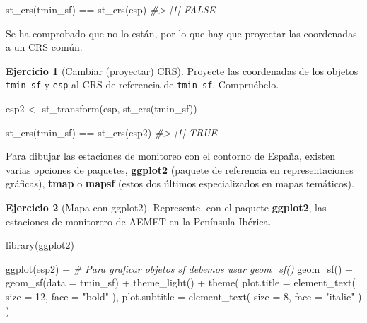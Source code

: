 \documentclass[
]{book}
\newenvironment{Shaded}{\begin{snugshade}}{\end{snugshade}}
\newcommand{\AttributeTok}[1]{\textcolor[rgb]{0.77,0.63,0.00}{#1}}
\newcommand{\CommentTok}[1]{\textcolor[rgb]{0.56,0.35,0.01}{\textit{#1}}}
\newcommand{\DecValTok}[1]{\textcolor[rgb]{0.00,0.00,0.81}{#1}}
\newcommand{\FunctionTok}[1]{\textcolor[rgb]{0.00,0.00,0.00}{#1}}
\newcommand{\NormalTok}[1]{#1}
\newcommand{\OtherTok}[1]{\textcolor[rgb]{0.56,0.35,0.01}{#1}}
\newcommand{\SpecialCharTok}[1]{\textcolor[rgb]{0.00,0.00,0.00}{#1}}
\newcommand{\StringTok}[1]{\textcolor[rgb]{0.31,0.60,0.02}{#1}}
\theoremstyle{definition}
\theoremstyle{definition}
\theoremstyle{definition}
\newtheorem{exercise}{Ejercicio}[chapter]
\theoremstyle{definition}
\theoremstyle{remark}
\begin{document}
\begin{Shaded}
\begin{Highlighting}[]
\FunctionTok{st\_crs}\NormalTok{(tmin\_sf) }\SpecialCharTok{==} \FunctionTok{st\_crs}\NormalTok{(esp)}
\CommentTok{\#\textgreater{} [1] FALSE}
\end{Highlighting}
\end{Shaded}

Se ha comprobado que no lo están, por lo que hay que proyectar las coordenadas a
un CRS común.

\begin{exercise}[Cambiar (proyectar) CRS]
\protect\hypertarget{exr:ex8}{}\label{exr:ex8}Proyecte las coordenadas de los objetos \texttt{tmin\_sf} y \texttt{esp} al CRS de referencia
de \texttt{tmin\_sf}. Compruébelo.
\end{exercise}

\begin{Shaded}
\begin{Highlighting}[]
\NormalTok{esp2 }\OtherTok{\textless{}{-}} \FunctionTok{st\_transform}\NormalTok{(esp, }\FunctionTok{st\_crs}\NormalTok{(tmin\_sf))}

\FunctionTok{st\_crs}\NormalTok{(tmin\_sf) }\SpecialCharTok{==} \FunctionTok{st\_crs}\NormalTok{(esp2)}
\CommentTok{\#\textgreater{} [1] TRUE}
\end{Highlighting}
\end{Shaded}

Para dibujar las estaciones de monitoreo con el contorno de España, existen
varias opciones de paquetes, \textbf{ggplot2} \citep{R-ggplot} (paquete de referencia en
representaciones gráficas), \textbf{tmap} \citep{R-tmap} o \textbf{mapsf} \citep{R-mapsf} (estos dos
últimos especializados en mapas temáticos).

\begin{exercise}[Mapa con ggplot2]
\protect\hypertarget{exr:ex9}{}\label{exr:ex9}Represente, con el paquete \textbf{ggplot2}, las estaciones de monitorero de AEMET en
la Península Ibérica.
\end{exercise}

\begin{Shaded}
\begin{Highlighting}[]
\FunctionTok{library}\NormalTok{(ggplot2)}

\FunctionTok{ggplot}\NormalTok{(esp2) }\SpecialCharTok{+}
  \CommentTok{\# Para graficar objetos sf debemos usar geom\_sf()}
  \FunctionTok{geom\_sf}\NormalTok{() }\SpecialCharTok{+}
  \FunctionTok{geom\_sf}\NormalTok{(}\AttributeTok{data =}\NormalTok{ tmin\_sf) }\SpecialCharTok{+}
  \FunctionTok{theme\_light}\NormalTok{() }\SpecialCharTok{+}
  \FunctionTok{theme}\NormalTok{(}
    \AttributeTok{plot.title =} \FunctionTok{element\_text}\NormalTok{(}
      \AttributeTok{size =} \DecValTok{12}\NormalTok{,}
      \AttributeTok{face =} \StringTok{"bold"}
\NormalTok{    ),}
    \AttributeTok{plot.subtitle =} \FunctionTok{element\_text}\NormalTok{(}
      \AttributeTok{size =} \DecValTok{8}\NormalTok{,}
      \AttributeTok{face =} \StringTok{"italic"}
\NormalTok{    )}
\NormalTok{  )}
\end{Highlighting}
\end{Shaded}
\end{document}
